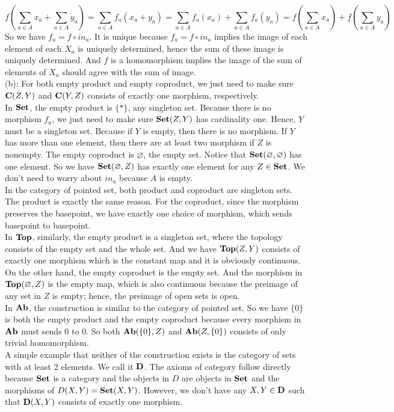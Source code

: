 \documentclass[12pt]{amsart}
\newcommand{\catname}[1]{{\normalfont\textbf{#1}}}
\newcommand{\Set}{\catname{Set}}
\newcommand{\Cat}{\catname{C}}
\newcommand{\Top}{\catname{Top}}
\newcommand{\Ab}{\catname{Ab}}
\begin{document}
\[f(\sum_{a\in A} x_a+\sum_{a\in A} y_a)=\sum_{a\in A}f_a(x_a+y_a)=\sum_{a\in A}f_a(x_a)+\sum_{a\in A}f_a(y_a)=f(\sum_{a\in A} x_a)+f(\sum_{a\in A} y_a)\]
So we have $f_a=f\circ in_a$. It is unique because $f_a=f\circ in_a$ implies the image of each element of each $X_a$ is uniquely determined, hence the sum of these image is uniquely determined. And $f$ is a homomorphism implies the image of the sum of elements of $X_a$ should agree with the sum of image.
\\
\break
(b): For both empty product and empty coproduct, we just need to make sure $\Cat(Z,Y)$ and $\Cat(Y,Z)$ consists of exactly one morphism, respectively.
\\In $\Set$, the empty product is $\{\ast\}$, any singleton set. Because there is no morphism $f_a$, we just need to make sure $\Set(Z,Y)$ has cardinality one. Hence, $Y$ must be a singleton set. Because if $Y$ is empty, then there is no morphism. If $Y$ has more than one element, then there are at least two morphism if $Z$ is nonempty. The empty coproduct is $\varnothing$, the empty set. Notice that $\Set(\varnothing,\varnothing)$ has one element. So we have $\Set(\varnothing,Z)$ has exactly one element for any $Z\in \Set$. We don't need to worry about $in_a$ because $A$ is empty.\\
In the category of pointed set, both product and coproduct are singleton sets. The product is exactly the same reason. For the coproduct, since the morphism preserves the basepoint, we have exactly one choice of morphism, which sends basepoint to basepoint.\\
In $\Top$, similarly, the empty product is a singleton set, where the topology consists of the empty set and the whole set. And we have $\Top(Z,Y)$ consists of exactly one morphism which is the constant map and it is obviously continuous. On the other hand, the empty coproduct is the empty set. And the morphism in $\Top(\varnothing, Z) $ is the empty map, which is also continuous because the preimage of any set in $Z$ is empty; hence, the preimage of open sets is open.\\
In $\Ab$, the construction is similar to the category of pointed set. So we have $\{0\}$ is both the empty product and the empty coproduct because every morphism in $\Ab$ must sends $0$ to $0$. So both $\Ab(\{0\},Z)$ and $\Ab(Z,\{0\})$ consists of only trivial homomorphism.\\
A simple example that neither of the construction exists is the category of sets with at least 2 elements. We call it $\normalfont\textbf{D}$. The axioms of category follow directly because $\Set$ is a category and the objects in $D$ are objects in $\Set$ and the morphisms of $D(X,Y)=\Set(X,Y)$. However, we don't have any $X,Y\in \normalfont\textbf{D}$ such that $\normalfont\textbf{D}(X,Y)$ consists of exactly one morphism.\\\break
\end{document}

